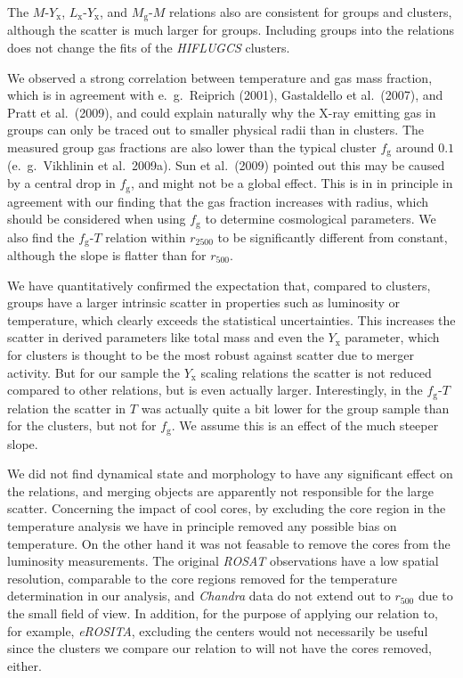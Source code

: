 \documentclass[structabstract]{aa}
\begin{document}
The $M$-$Y_{\text{x}}$, $L_{\text{x}}$-$Y_{\text{x}}$, and
$M_{\text{g}}$-$M$ relations also are consistent for groups and
  clusters, although the scatter is much larger for groups. Including
  groups into the relations does not change the fits of the
  \emph{HIFLUGCS} clusters.

We observed a strong correlation between temperature and gas mass
fraction, which is in agreement with e.\ g.\ Reiprich (2001),
Gastaldello et al.\ (2007), and Pratt et al.\ (2009), and could
explain naturally why the X-ray emitting gas in groups can only be
traced out to smaller physical radii than in clusters. The measured group
gas fractions are also lower than the typical cluster $f_{\text{g}}$
around $0.1$ (e.\ g.\ Vikhlinin et al.\ 2009a). Sun et al.\ (2009)
pointed out this may be caused by a central drop in $f_{\text{g}}$,
and might not be a global effect. This is in in principle in agreement
with our finding that the gas fraction increases with radius, which
should be considered when using $f_{\text{g}}$ to determine
cosmological parameters. We also find the $f_{\text{g}}$-$T$
relation within $r_{2500}$ to be significantly different from
constant, although the slope is flatter than for
$r_{500}$.

We have quantitatively confirmed the expectation that, compared to
clusters, groups have a larger intrinsic scatter in properties such as
luminosity or temperature, which clearly exceeds the statistical
uncertainties. This increases the scatter in derived parameters like
total mass and even the $Y_{\text{x}}$ parameter, which for clusters
is thought to be the most robust against scatter due to merger
activity. But for our sample the $Y_{\text{x}}$ scaling relations the
scatter is not reduced compared to other relations, but is even
actually larger. Interestingly, in the $f_{\text{g}}$-$T$ relation
the scatter in $T$ was actually quite a bit lower for the group sample
than for the clusters, but not for $f_{\text{g}}$. We assume this is
an effect of the much steeper slope.

We did not find dynamical state and morphology to have any significant
effect on the relations, and merging objects are apparently not
  responsible for the large scatter. Concerning the impact of cool
  cores, by excluding the core region in the temperature analysis we
  have in principle removed any possible bias on temperature. On the
  other hand it was not feasable to remove the cores from the
  luminosity measurements. The original \emph{ROSAT} observations have
  a low spatial resolution, comparable to the core regions removed for
  the temperature determination in our analysis, and \emph{Chandra}
  data do not extend out to $r_{500}$ due to the small field of
  view. In addition, for the purpose of applying our relation to, for
  example, \emph{eROSITA}, excluding the centers would not necessarily
  be useful since the clusters we compare our relation to will not
  have the cores removed, either.
\end{document}
